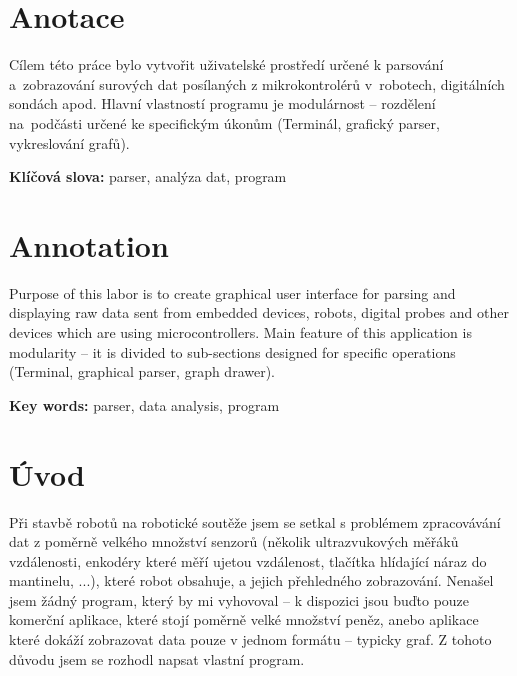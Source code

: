 \documentclass[12pt, a4paper, oneside]{article}
\newcommand{\D}{\medskip \noindent} %
\newcommand{\B}{\textbf} %
\begin{document}
\section*{Anotace }

    Cílem této práce bylo vytvořit uživatelské prostředí určené k parsování a~zobrazování surových dat posílaných z mikrokontrolérů v~robotech, digitálních sondách apod. 
Hlavní vlastností programu je modulárnost -- rozdělení na~podčásti určené ke specifickým úkonům (Terminál, grafický parser, vykreslování grafů).

\D \B{Klíčová slova:} parser, analýza dat, program

\section*{Annotation}

    Purpose of this labor is to create graphical user interface for parsing and displaying raw data sent from embedded devices, robots, digital probes and other devices which are using microcontrollers.
Main feature of this application is modularity -- it is divided to sub-sections designed for specific operations (Terminal, graphical parser, graph drawer).

\D \B{Key words:} parser, data analysis, program

\addtolength{\textheight}{30mm} %

\newpage

\setlength{\voffset}{-20mm} %

\tableofcontents  %

\addtolength{\textheight}{-30mm} %
\newpage
\setlength{\voffset}{0mm} %
\pagestyle{plain}
\section*{Úvod}

Při stavbě robotů na robotické soutěže jsem se setkal s problémem zpracovávání dat z poměrně velkého množství senzorů (několik ultrazvukových měřáků vzdálenosti, enkodéry které měří ujetou vzdálenost, tlačítka hlídající náraz do mantinelu, ...), které robot obsahuje, a jejich přehledného zobrazování. Nenašel jsem žádný program, který by mi vyhovoval -- k dispozici jsou buďto pouze komerční aplikace, které stojí poměrně velké množství peněz, anebo aplikace které dokáží zobrazovat data pouze v jednom formátu -- typicky graf. Z tohoto důvodu jsem se rozhodl napsat vlastní program.
\end{document}

